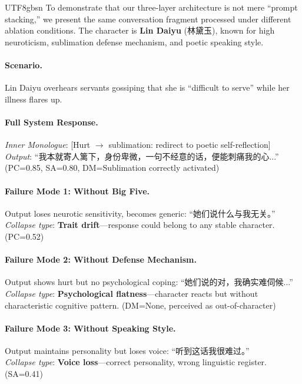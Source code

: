 \documentclass[11pt]{article}
\begin{document}
\begin{CJK*}{UTF8}{gbsn}
To demonstrate that our three-layer architecture is not mere ``prompt stacking,'' we present the same conversation fragment processed under different ablation conditions. The character is \textbf{Lin Daiyu} (林黛玉), known for high neuroticism, sublimation defense mechanism, and poetic speaking style.

\paragraph{Scenario.} Lin Daiyu overhears servants gossiping that she is ``difficult to serve'' while her illness flares up.

\paragraph{Full System Response.}
\textit{Inner Monologue}: [Hurt $\rightarrow$ sublimation: redirect to poetic self-reflection] \\
\textit{Output}: ``我本就寄人篱下，身份卑微，一句不经意的话，便能刺痛我的心...'' (PC=0.85, SA=0.80, DM=Sublimation correctly activated)

\paragraph{Failure Mode 1: Without Big Five.}
Output loses neurotic sensitivity, becomes generic: ``她们说什么与我无关。'' \\
\textit{Collapse type}: \textbf{Trait drift}---response could belong to any stable character. (PC=0.52)

\paragraph{Failure Mode 2: Without Defense Mechanism.}
Output shows hurt but no psychological coping: ``她们说的对，我确实难伺候...'' \\
\textit{Collapse type}: \textbf{Psychological flatness}---character reacts but without characteristic cognitive pattern. (DM=None, perceived as out-of-character)

\paragraph{Failure Mode 3: Without Speaking Style.}
Output maintains personality but loses voice: ``听到这话我很难过。'' \\
\textit{Collapse type}: \textbf{Voice loss}---correct personality, wrong linguistic register. (SA=0.41)


\end{CJK*}
\end{document}
